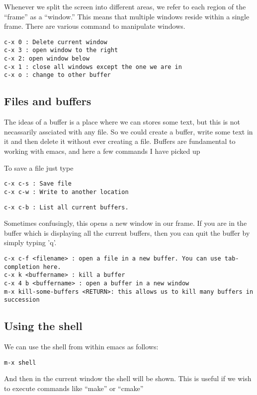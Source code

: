 \documentclass[a4paper, 10pt]{article}
\begin{document}
Whenever we split the screen into different areas, we refer to each region of the ``frame'' as a ``window.'' This means that multiple windows reside within a single frame. There are various command to manipulate windows.  
  
\begin{verbatim}
c-x 0 : Delete current window
c-x 3 : open window to the right
c-x 2: open window below
c-x 1 : close all windows except the one we are in
c-x o : change to other buffer
 \end{verbatim}
 
\subsection*{Files and buffers}

The ideas of a buffer is a place where we can stores some text, but this is not necassarily assciated with any file. So we could create a buffer, write some text in it and then delete it without ever creating a file. Buffers are fundamental to working with emacs, and here a few commands I have picked up

To save a file just type
\begin{verbatim}
c-x c-s : Save file
c-x c-w : Write to another location
\end{verbatim}


\begin{verbatim}
c-x c-b : List all current buffers. 
\end{verbatim}
Sometimes confusingly, this opens a new window in our frame. If you are in the  buffer which is displaying all the current buffers, then you can quit the buffer by simply typing 'q'.
\begin{verbatim}
c-x c-f <filename> : open a file in a new buffer. You can use tab-completion here.
c-x k <buffername> : kill a buffer
c-x 4 b <buffername> : open a buffer in a new window
m-x kill-some-buffers <RETURN>: this allows us to kill many buffers in succession
\end{verbatim}

\subsection*{Using the shell}
We can use the shell from within emacs as follows:
\begin{verbatim}
m-x shell
\end{verbatim}
And then in the current window the shell will be shown. This is useful if we wish to execute commands like ``make'' or ``cmake''
 
\end{document}

